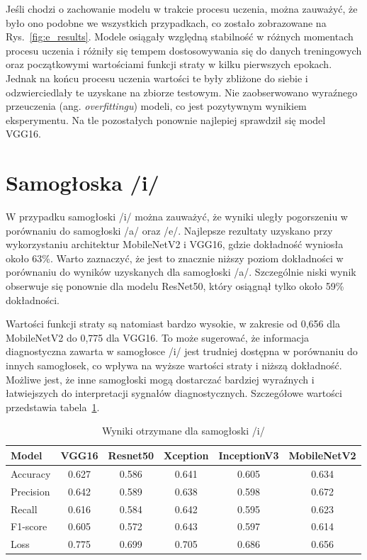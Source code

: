 Jeśli chodzi o zachowanie modelu w trakcie procesu uczenia, można zauważyć, że było ono podobne we wszystkich przypadkach, co zostało zobrazowane na Rys.~\ref{fig:e_results}.
Modele osiągały względną stabilność w różnych momentach procesu uczenia i różniły się tempem dostosowywania się do danych treningowych oraz początkowymi wartościami funkcji straty w kilku pierwszych epokach.
Jednak na końcu procesu uczenia wartości te były zbliżone do siebie i odzwierciedlały te uzyskane na zbiorze testowym.
Nie zaobserwowano wyraźnego przeuczenia (ang. \emph{overfittingu}) modeli, co jest pozytywnym wynikiem eksperymentu.
Na tle pozostałych ponownie najlepiej sprawdził się model VGG16.

\section{Samogłoska /i/}
\label{sec:samogloska-i}

W przypadku samogłoski /i/ można zauważyć, że wyniki uległy pogorszeniu w porównaniu do samogłoski /a/ oraz /e/.
Najlepsze rezultaty uzyskano przy wykorzystaniu architektur MobileNetV2 i VGG16, gdzie dokładność wyniosła około 63\%.
Warto zaznaczyć, że jest to znacznie niższy poziom dokładności w porównaniu do wyników uzyskanych dla samogłoski /a/.
Szczególnie niski wynik obserwuje się ponownie dla modelu ResNet50, który osiągnął tylko około 59\% dokładności.

Wartości funkcji straty są natomiast bardzo wysokie, w zakresie od 0,656 dla MobileNetV2 do 0,775 dla VGG16.
To może sugerować, że informacja diagnostyczna zawarta w samogłosce /i/ jest trudniej dostępna w porównaniu do innych samogłosek, co wpływa na wyższe wartości straty i niższą dokładność.
Możliwe jest, że inne samogłoski mogą dostarczać bardziej wyraźnych i łatwiejszych do interpretacji sygnałów diagnostycznych.
Szczegółowe wartości przedstawia tabela~\ref{tab:wyniki-i}.

\begin{table}[ht]
\centering
\caption{Wyniki otrzymane dla samogłoski /i/}
\label{tab:wyniki-i}
\begin{tabular}{|l|c|c|c|c|c|}
\hline
\textbf{Model} &\textbf{VGG16} &\textbf{Resnet50} &\textbf{Xception} &\textbf{InceptionV3} &\textbf{MobileNetV2} \\ \hline
    Accuracy &0.627 &0.586 &0.641 &0.605 &0.634 \\ \hline
    Precision &0.642 &0.589 &0.638 &0.598 &0.672 \\ \hline
    Recall &0.616 &0.584 &0.642 &0.595  &0.623 \\ \hline
    F1-score &0.605 &0.572 &0.643 &0.597 &0.614 \\ \hline
    Loss &0.775 &0.699 &0.705 &0.686 &0.656 \\ \hline
\end{tabular}
\end{table}

